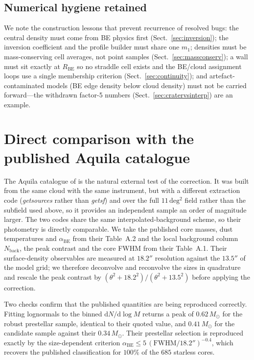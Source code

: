 \documentclass[11pt,a4paper]{article}
\newcommand{\msun}{M_{\odot}}
\newcommand{\Rbe}{R_{\mathrm{BE}}}
\begin{document}
\subsection{Numerical hygiene retained}

We note the construction lessons that prevent recurrence of resolved bugs:
the central density must come from BE physics first
(Sect.~\ref{sec:inversion}); the inversion coefficient and the profile
builder must share one $m_{1}$; densities must be mass-conserving cell
averages, not point samples (Sect.~\ref{sec:massconserv}); a wall must sit
exactly at $\Rbe$ so no straddle cell exists and the BE/cloud assignment
loops use a single membership criterion (Sect.~\ref{sec:continuity}); and
artefact-contaminated models (BE edge density below cloud density) must not
be carried forward---the withdrawn factor-5 numbers
(Sect.~\ref{sec:cratervsinterp}) are an example.

\section{Direct comparison with the published Aquila catalogue}
\label{sec:konyves}

The Aquila catalogue of \citet{Konyves+2015} is the natural external test of
the correction. It was built from the same cloud with the same instrument,
but with a different extraction code (\emph{getsources} rather than
\emph{getsf}) and over the full $11\,\mathrm{deg^2}$ field rather than the
subfield used above, so it provides an independent sample an order of
magnitude larger. The two codes share the same interpolated-background
scheme, so their photometry is directly comparable. We take the published
core masses, dust temperatures and $\alpha_{\mathrm{BE}}$ from their Table~A.2
and the local background column $N_{\mathrm{back}}$, the peak contrast and the
core FWHM from their Table~A.1. Their surface-density observables are measured
at $18.2''$ resolution against the $13.5''$ of the model grid; we therefore
deconvolve and reconvolve the sizes in quadrature and rescale the peak
contrast by $(\theta^2+18.2^2)/(\theta^2+13.5^2)$ before applying the
correction.

Two checks confirm that the published quantities are being reproduced
correctly. Fitting lognormals to the binned $\mathrm{d}N/\mathrm{d}\log M$
returns a peak of $0.62\,\msun$ for the robust prestellar sample, identical to
their quoted value, and $0.41\,\msun$ for the candidate sample against their
$0.34\,\msun$. Their prestellar selection is reproduced exactly by the
size-dependent criterion
$\alpha_{\mathrm{BE}}\le5\,(\mathrm{FWHM}/18.2'')^{-0.4}$, which recovers the
published classification for $100\%$ of the $685$ starless cores.
\end{document}
